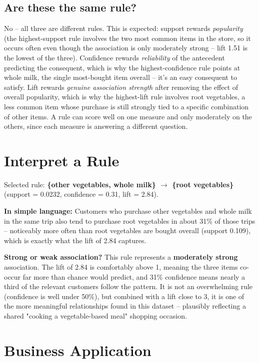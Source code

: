 \documentclass[12pt,a4paper]{article}
\begin{document}
\subsection{Are these the same rule?}
No -- all three are different rules. This is expected: support rewards
\emph{popularity} (the highest-support rule involves the two most common items in the
store, so it occurs often even though the association is only moderately strong -- lift
1.51 is the lowest of the three). Confidence rewards \emph{reliability} of the antecedent
predicting the consequent, which is why the highest-confidence rule points at whole milk,
the single most-bought item overall -- it's an easy consequent to satisfy. Lift rewards
\emph{genuine association strength} after removing the effect of overall popularity, which
is why the highest-lift rule involves root vegetables, a less common item whose purchase is
still strongly tied to a specific combination of other items. A rule can score well on one
measure and only moderately on the others, since each measure is answering a different
question.

\clearpage
\section{Interpret a Rule}

Selected rule: \textbf{\{other vegetables, whole milk\} $\rightarrow$ \{root vegetables\}}
(support = 0.0232, confidence = 0.31, lift = 2.84).

\textbf{In simple language:} Customers who purchase other vegetables and whole milk in the
same trip also tend to purchase root vegetables in about 31\% of those trips -- noticeably
more often than root vegetables are bought overall (support 0.109), which is exactly what
the lift of 2.84 captures.

\textbf{Strong or weak association?} This rule represents a \textbf{moderately strong}
association. The lift of 2.84 is comfortably above 1, meaning the three items co-occur far
more than chance would predict, and 31\% confidence means nearly a third of the relevant
customers follow the pattern. It is not an overwhelming rule (confidence is well under 50\%),
but combined with a lift close to 3, it is one of the more meaningful relationships found in
this dataset -- plausibly reflecting a shared "cooking a vegetable-based meal" shopping
occasion.

\clearpage
\section{Business Application}
\end{document}
